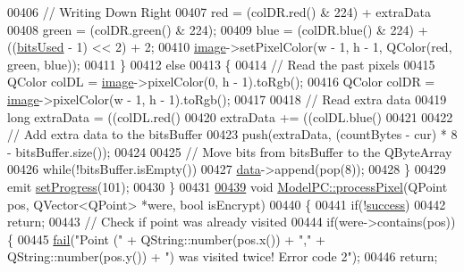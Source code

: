 \begin{DoxyCode}
00406         \textcolor{comment}{// Writing Down Right}
00407         red = (colDR.red() & 224) + extraData %
00408         green = (colDR.green() & 224);
00409         blue = (colDR.blue() & 224) + ((\mbox{\hyperlink{class_model_p_c_a655deb6a8afa94c7f4aadb3056989038}{bitsUsed}} - 1) << 2) + 2;
00410         \mbox{\hyperlink{namespacetests-setup_ad55b685280f549e15688a94cbb89f512}{image}}->setPixelColor(w - 1, h - 1, QColor(red, green, blue));
00411     \}
00412     \textcolor{keywordflow}{else}
00413     \{
00414         \textcolor{comment}{// Read the past pixels}
00415         QColor colDL = \mbox{\hyperlink{namespacetests-setup_ad55b685280f549e15688a94cbb89f512}{image}}->pixelColor(0, h - 1).toRgb();
00416         QColor colDR = \mbox{\hyperlink{namespacetests-setup_ad55b685280f549e15688a94cbb89f512}{image}}->pixelColor(w - 1, h - 1).toRgb();
00417 
00418         \textcolor{comment}{// Read extra data}
00419         \textcolor{keywordtype}{long} extraData = ((colDL.red() %
00420         extraData += ((colDL.blue() %
00421 
00422         \textcolor{comment}{// Add extra data to the bitsBuffer}
00423         push(extraData, (countBytes - cur) * 8 - bitsBuffer.size());
00424 
00425         \textcolor{comment}{// Move bits from bitsBuffer to the QByteArray}
00426         \textcolor{keywordflow}{while}(!bitsBuffer.isEmpty())
00427             \mbox{\hyperlink{namespace_errors_dict_setup_af570460846fb9f0c91abd308a095dcdc}{data}}->append(pop(8));
00428     \}
00429     emit \mbox{\hyperlink{class_model_p_c_a25a4496e129e87ac96f12257a123b84f}{setProgress}}(101);
00430 \}
00431 
\mbox{\hyperlink{class_model_p_c_a1171f9fe1550133dc9053a46b4e5bcfd}{00439}} \textcolor{keywordtype}{void} \mbox{\hyperlink{class_model_p_c_a1171f9fe1550133dc9053a46b4e5bcfd}{ModelPC::processPixel}}(QPoint pos, QVector<QPoint> *were, \textcolor{keywordtype}{bool} isEncrypt)
00440 \{
00441     \textcolor{keywordflow}{if}(!\mbox{\hyperlink{class_model_p_c_a945ffbbc44a832b953c191debd448f4c}{success}})
00442         \textcolor{keywordflow}{return};
00443     \textcolor{comment}{// Check if point was already visited}
00444     \textcolor{keywordflow}{if}(were->contains(pos))\{
00445         \mbox{\hyperlink{class_model_p_c_a47464b59b7e37fcee25e55475708aabd}{fail}}(\textcolor{stringliteral}{"Point ("} + QString::number(pos.x()) + \textcolor{stringliteral}{","} + QString::number(pos.y()) + \textcolor{stringliteral}{") was visited
       twice! Error code 2"});
00446         \textcolor{keywordflow}{return};

\end{DoxyCode}
